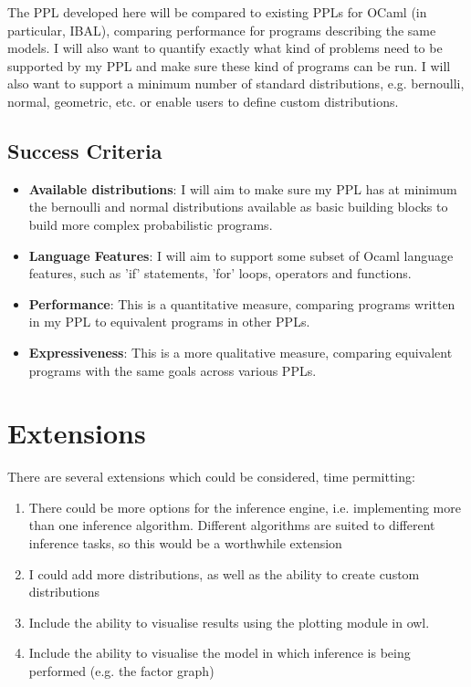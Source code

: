 The PPL developed here will be compared to existing PPLs for OCaml (in particular, IBAL), comparing performance for programs describing the same models. I will also want to quantify exactly what kind of problems need to be supported by my PPL and make sure these kind of programs can be run. I will also want to support a minimum number of standard distributions, e.g. bernoulli, normal, geometric, etc. or enable users to define custom distributions.

\subsection*{Success Criteria}

\begin{itemize}
      \item \textbf{Available distributions}: I will aim to make sure my PPL has at minimum the bernoulli and normal distributions available as basic building blocks to build more complex probabilistic programs.
      \item \textbf{Language Features}: I will aim to support some subset of Ocaml language features, such as 'if' statements, 'for' loops, operators and functions.
      \item \textbf{Performance}: This is a quantitative measure, comparing programs written in my PPL to equivalent programs in other PPLs.
      \item \textbf{Expressiveness}: This is a more qualitative measure, comparing equivalent programs with the same goals across various PPLs.
\end{itemize}

\section*{Extensions}

There are several extensions which could be considered, time permitting:

\begin{enumerate}
      \item There could be more options for the inference engine, i.e. implementing more than one inference algorithm. Different algorithms are suited to different inference tasks, so this would be a worthwhile extension
      \item I could add more distributions, as well as the ability to create custom distributions
      \item Include the ability to visualise results using the plotting module in owl.
      \item Include the ability to visualise the model in which inference is being performed (e.g. the factor graph)
\end{enumerate}


